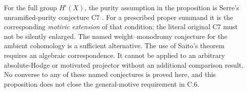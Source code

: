 \begin{remark}
\label{c:chow-purity-scope}
For the full group $H^i(X)$, the purity assumption in the proposition
is Serre's unramified-purity conjecture C7
\citep[\S2.3, printed p.~19-07]{c_serre1970local}.
For a prescribed proper summand it is the corresponding
\emph{motivic extension} of that condition; the literal original C7
must not be silently enlarged.  The named weight--monodromy
conjecture for the ambient cohomology is a sufficient alternative.
The use of Saito's theorem requires an algebraic correspondence.
It cannot be applied to an arbitrary absolute-Hodge or motivated
projector without an additional comparison result.  No converse to
any of these named conjectures is proved here, and this proposition
does not close the general-motive requirement in C.6.
\end{remark}

